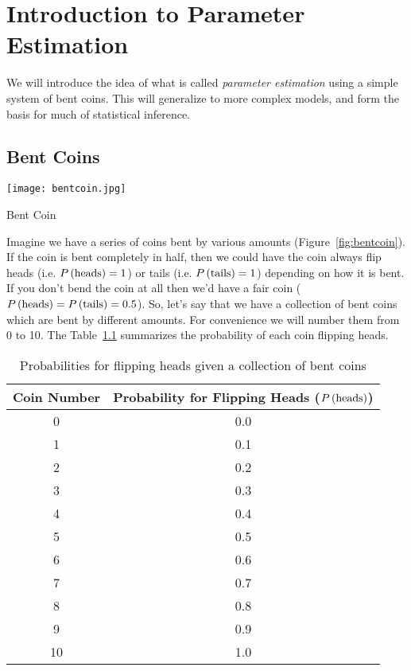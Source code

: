 \chapter{Introduction to Parameter Estimation}\label{ch:parameter1}
We will introduce the idea of what is called {\em parameter estimation} using a simple system of bent coins.  This will generalize to more complex models, and form the basis for much of statistical inference.

\section{Bent Coins}\label{sec:intro_bent_coin}

\begin{marginfigure}
\texttt{[image: bentcoin.jpg]}
\label{fig:bentcoin}
\caption{Bent Coin}
\end{marginfigure}


Imagine we have a series of coins bent by various amounts (Figure~\ref{fig:bentcoin}).  If the coin is bent completely in half, then we could have the coin always flip heads (i.e. $\P{heads}=1$) or tails (i.e. $\P{tails}=1$) depending on how it is bent.  If you don't bend the coin at all then we'd have a fair coin ($\P{heads}=\P{tails}=0.5$).
  So, let's say that we have a collection of bent coins which are bent by different amounts.  For convenience we will number them from 0 to 10.    The Table~\ref{tbl:bentcoin} summarizes the probability of each coin flipping heads.
\begin{table}
\begin{center}
\begin{tabular}{cc}
Coin Number & Probability for Flipping Heads ($\P{heads}$) \\ \hline\hline
0 & 0.0 \\
1 & 0.1 \\
2 & 0.2 \\
3 & 0.3 \\
4 & 0.4 \\
5 & 0.5 \\
6 & 0.6 \\
7 & 0.7 \\
8 & 0.8 \\
9 & 0.9 \\
10 & 1.0
\end{tabular}
\end{center}
\label{tbl:bentcoin}
\caption{Probabilities for flipping heads given a collection of bent coins}
\end{table}

